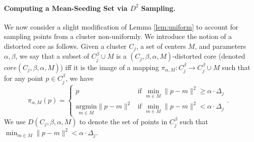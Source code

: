 \documentclass[10pt,a4paper]{amsart}
\begin{document}
\paragraph{Computing a Mean-Seeding Set via $D^2$ Sampling.}

We now consider a slight modification of Lemma \ref{lem:uniform} to account for sampling points from a cluster non-uniformly. We introduce the notion of a distorted core as follows.
Given a cluster $C_j$, a set of centers $M$, and parameters $\alpha,\beta$, we say that a subset of $C_j^{\beta}\cup M$ is a $(C_j,\beta,\alpha,M)$-distorted core (denoted $core(C_j,\beta,\alpha,M)$) iff it is the image of a mapping $\pi_{\alpha,M}:C_j^\beta\rightarrow C_j^\beta\cup M$ such that for any point $p\in C_j^\beta$, we have
$$\pi_{\alpha,M}(p) = \begin{cases} p &\text{if }\min_{m\in M}\|p-m\|^2 \geq \alpha\cdot \Delta_j \\  \underset{m\in M}{\text{argmin}}\|p-m\|^2 & \text{if }\min_{m\in M}\|p-m\|^2 < \alpha\cdot \Delta_j\end{cases}.$$
We use $D(C_j,\beta,\alpha,M)$ to denote the set of points in $C_j^\beta$ such that $\min_{m\in M}\|p-m\|^2 < \alpha\cdot \Delta_j$.
\end{document}

